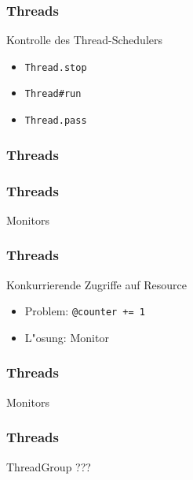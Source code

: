 \begin{frame}
  \frametitle{Threads}
  Kontrolle des Thread-Schedulers
  \begin{itemize}
    \item \texttt{Thread.stop} 
    \item \texttt{Thread\#run}
    \item \texttt{Thread.pass}
  \end{itemize}
\end{frame}

\begin{frame}
  \frametitle{Threads}
  
\end{frame}

\begin{frame}
  \frametitle{Threads}
  Monitors
  
\end{frame}

\begin{frame}
  \frametitle{Threads}
  Konkurrierende Zugriffe auf Resource
  \begin{itemize}
    \item Problem: \texttt{@counter += 1}\\
    \pause
    \item L"osung: Monitor
  \end{itemize}
\end{frame}

\begin{frame}
  \frametitle{Threads}
  Monitors
  
\end{frame}

\begin{frame}
  \frametitle{Threads}
  ThreadGroup ???
\end{frame}

